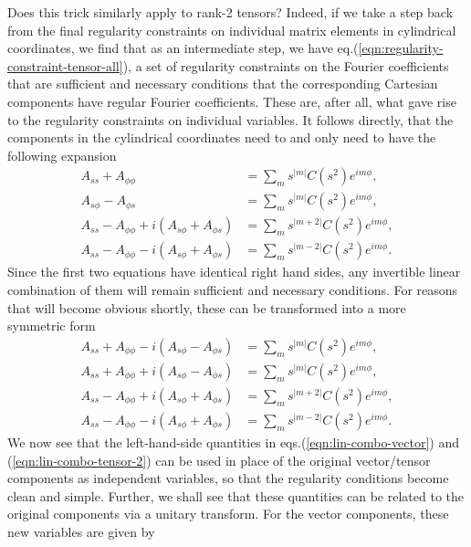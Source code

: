Does this trick similarly apply to rank-2 tensors?
Indeed, if we take a step back from the final regularity constraints on individual matrix elements in cylindrical coordinates, we find that as an intermediate step, we have eq.(\ref{eqn:regularity-constraint-tensor-all}), a set of regularity constraints on the Fourier coefficients that are sufficient and necessary conditions that the corresponding Cartesian components have regular Fourier coefficients.
These are, after all, what gave rise to the regularity constraints on individual variables.
It follows directly, that the components in the cylindrical coordinates need to and only need to have the following expansion
\[
    \begin{aligned}
        A_{ss} + A_{\phi\phi} &= \sum_{m} s^{|m|} C(s^2) e^{im\phi}, \\ 
        A_{s\phi} - A_{\phi s} &= \sum_{m} s^{|m|} C(s^2) e^{im\phi}, \\ 
        A_{ss} - A_{\phi\phi} + i \left(A_{s\phi} + A_{\phi s}\right) &= \sum_{m} s^{|m + 2|} C(s^2) e^{im\phi}, \\ 
        A_{ss} - A_{\phi\phi} - i \left(A_{s\phi} + A_{\phi s}\right) &= \sum_{m} s^{|m - 2|} C(s^2) e^{im\phi}.
    \end{aligned}
\]
Since the first two equations have identical right hand sides, any invertible linear combination of them will remain sufficient and necessary conditions. For reasons that will become obvious shortly, these can be transformed into a more symmetric form
\begin{equation}\label{eqn:lin-combo-tensor-2}
    \begin{aligned}
        A_{ss} + A_{\phi\phi} - i \left(A_{s\phi} - A_{\phi s}\right) &= \sum_{m} s^{|m|} C(s^2) e^{im\phi}, \\ 
        A_{ss} + A_{\phi \phi} + i \left(A_{s\phi} - A_{\phi s}\right) &= \sum_{m} s^{|m|} C(s^2) e^{im\phi}, \\ 
        A_{ss} - A_{\phi\phi} + i \left(A_{s\phi} + A_{\phi s}\right) &= \sum_{m} s^{|m + 2|} C(s^2) e^{im\phi}, \\ 
        A_{ss} - A_{\phi\phi} - i \left(A_{s\phi} + A_{\phi s}\right) &= \sum_{m} s^{|m - 2|} C(s^2) e^{im\phi}.
    \end{aligned}
\end{equation}
We now see that the left-hand-side quantities in eqs.(\ref{eqn:lin-combo-vector}) and (\ref{eqn:lin-combo-tensor-2}) can be used in place of the original vector/tensor components as independent variables, so that the regularity conditions become clean and simple. Further, we shall see that these quantities can be related to the original components via a unitary transform. For the vector components, these new variables are given by
